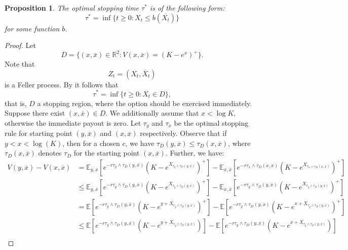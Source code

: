 \documentclass[10pt,a4paper]{amsart}
\def\E{{\mathbb{E}}}
\def \R{{{\rm I{\!}\rm R}}}
\def\E{{\mathbb E}} \def\PP{\mc P} \def\Z{{\mathbb Z}} \def\R{{\mathbb R}}
\newtheorem{Prop}{Proposition}
\begin{document}
	\begin{Prop}\label{thm1}
		The optimal stopping time $\tau^*$ is of the following form:
		\begin{equation*}
			\tau^* = \inf \{ t \geq 0: X_t \leq b(\overline{X_t}) \}
		\end{equation*}
		for some function $b$.
	\end{Prop}
	\begin{proof}
		Let
		\begin{equation*}
			D = \{ (x,\overline{x})\in \mathbb{R}^2: V(x, \overline{x}) = (K - e^x)^+ \}.
		\end{equation*}
		Note that
		\begin{equation*}
			Z_t = (X_t,\overline{X}_t)
		\end{equation*}
		is a Feller process.
		By \cite[Thm. 2.7, p. 40 and (2.2.80), p. 49]{PS} it follows that $$\tau^*=\inf\{t\geq 0: X_t\in D\},$$
that is, $D$ a stopping region, where the option should be exercised immediately.
		Suppose there exist $(x,\overline{x}) \in D$. We additionally assume that $x < \log K$, otherwise the immediate payout is zero. Let $\tau_y$ and $\tau_x$ be the optimal stopping rule for starting point $(y, \overline{x})$ and $(x, \overline{x})$ respectively. Observe that if $y < x < \log(K)$, then for a chosen $c$, we have $\tau_D(y, \overline{x}) \leq \tau_D(x,\overline{x})$, where $\tau_D(x,\overline{x})$ denotes $\tau_D$ for the starting point $(x, \overline{x})$. Further, we have:
		\begin{align*}
			V(y, \overline{x}) - V(x, \overline{x}) &= \E_{y,\overline{x}}[e^{-r\tau_y\wedge\tau_D(y,\overline{x})}(K - e^{X_{\tau_y\wedge\tau_D(y,\overline{x})}})^+] - \E_{x,\overline{x}}[e^{-r\tau_x\wedge\tau_D(x,\overline{x})}(K - e^{X_{\tau_x\wedge\tau_D(x,\overline{x})}})^+] \\
			&\leq \E_{y,\overline{x}}[e^{-r\tau_y\wedge\tau_D(y,\overline{x})}(K - e^{X_{\tau_y\wedge\tau_D(y,\overline{x})}})^+] - \E_{x,\overline{x}}[e^{-r\tau_y\wedge\tau_D(y,\overline{x})}(K - e^{X_{\tau_y\wedge\tau_D(y,\overline{x})}})^+] \\
			& = \E[e^{-r\tau_y\wedge\tau_D(y,\overline{x})}(K - e^{y + X_{\tau_y\wedge\tau_D(y,\overline{x})}})^+] - \E[e^{-r\tau_y\wedge\tau_D(y,\overline{x})}(K - e^{x + X_{\tau_y\wedge\tau_D(y,\overline{x})}})^+] \\
			& \leq \E[e^{-r\tau_y\wedge\tau_D(y,\overline{x})}(K - e^{y + X_{\tau_y\wedge\tau_D(y,\overline{x})}})] - \E[e^{-r\tau_y\wedge\tau_D(y,\overline{x})}(K - e^{x + X_{\tau_y\wedge\tau_D(y,\overline{x})}})] \\

\end{align*}
\end{proof}
\end{document}
